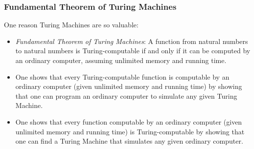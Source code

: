 \begin{frame}
\frametitle{Fundamental Theorem of Turing Machines}

One reason Turing Machines are so valuable:

\begin{itemize}[<+->]

\item \emph{Fundamental Theorem of Turing Machines}: A function from natural numbers to natural numbers is Turing-computable if and only if it can be computed by an ordinary computer, assuming unlimited memory and running time.

\item  One shows that every Turing-computable function is computable by an ordinary computer (given unlimited memory and running time) by showing that one can program an ordinary computer to simulate any given Turing Machine.

\item  One shows that every function computable by an ordinary computer (given unlimited memory and running time) is Turing-computable by showing that one can find a Turing Machine that simulates any given ordinary computer.


\end{itemize}
\end{frame}

